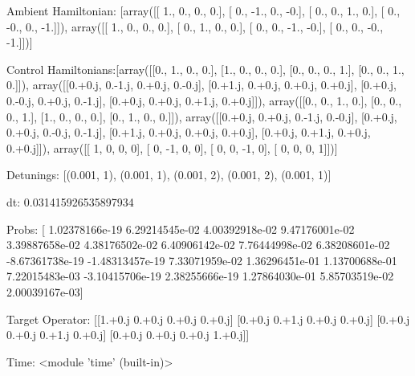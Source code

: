 \documentclass{article}
\begin{document}
    

\newpage

Ambient Hamiltonian: [array([[ 1.,  0.,  0.,  0.],
       [ 0., -1.,  0., -0.],
       [ 0.,  0.,  1.,  0.],
       [ 0., -0.,  0., -1.]]), array([[ 1.,  0.,  0.,  0.],
       [ 0.,  1.,  0.,  0.],
       [ 0.,  0., -1., -0.],
       [ 0.,  0., -0., -1.]])]

Control Hamiltonians:[array([[0., 1., 0., 0.],
       [1., 0., 0., 0.],
       [0., 0., 0., 1.],
       [0., 0., 1., 0.]]), array([[0.+0.j, 0.-1.j, 0.+0.j, 0.-0.j],
       [0.+1.j, 0.+0.j, 0.+0.j, 0.+0.j],
       [0.+0.j, 0.-0.j, 0.+0.j, 0.-1.j],
       [0.+0.j, 0.+0.j, 0.+1.j, 0.+0.j]]), array([[0., 0., 1., 0.],
       [0., 0., 0., 1.],
       [1., 0., 0., 0.],
       [0., 1., 0., 0.]]), array([[0.+0.j, 0.+0.j, 0.-1.j, 0.-0.j],
       [0.+0.j, 0.+0.j, 0.-0.j, 0.-1.j],
       [0.+1.j, 0.+0.j, 0.+0.j, 0.+0.j],
       [0.+0.j, 0.+1.j, 0.+0.j, 0.+0.j]]), array([[ 1,  0,  0,  0],
       [ 0, -1,  0,  0],
       [ 0,  0, -1,  0],
       [ 0,  0,  0,  1]])]

Detunings: [(0.001, 1), (0.001, 1), (0.001, 2), (0.001, 2), (0.001, 1)]

 dt: 0.031415926535897934

Probs: [ 1.02378166e-19  6.29214545e-02  4.00392918e-02  9.47176001e-02
  3.39887658e-02  4.38176502e-02  6.40906142e-02  7.76444998e-02
  6.38208601e-02 -8.67361738e-19 -1.48313457e-19  7.33071959e-02
  1.36296451e-01  1.13700688e-01  7.22015483e-03 -3.10415706e-19
  2.38255666e-19  1.27864030e-01  5.85703519e-02  2.00039167e-03]

Target Operator: [[1.+0.j 0.+0.j 0.+0.j 0.+0.j]
 [0.+0.j 0.+1.j 0.+0.j 0.+0.j]
 [0.+0.j 0.+0.j 0.+1.j 0.+0.j]
 [0.+0.j 0.+0.j 0.+0.j 1.+0.j]]

Time: <module 'time' (built-in)>
\end{document}
